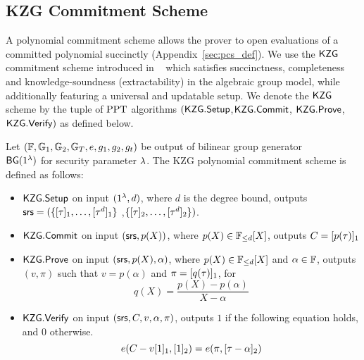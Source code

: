 \subsection{KZG Commitment Scheme}
\label{sec:KZG}
A polynomial commitment scheme allows the prover to open evaluations of a committed polynomial succinctly (Appendix~\ref{sec:pcs_def}).
We use the $\mathsf{KZG}$ commitment scheme introduced in ~\cite{AC:KatZavGol10} which satisfies succinctness, completeness and knowledge-soundness (extractability)
in the algebraic group model, while additionally featuring a universal and updatable setup. We denote the $\mathsf{KZG}$ scheme by the tuple of $\mathrm{PPT}$ algorithms $(\mathsf{KZG.Setup}$,$\mathsf{KZG.Commit}$, $\mathsf{KZG.Prove}$, $\mathsf{KZG.Verify})$ as defined below.
\begin{definition}
	Let $(\mathbb{F},\mathbb{G}_1,\mathbb{G}_2,\mathbb{G}_T, e, g_1, g_2, g_t)$ be output of bilinear group generator \\
	$\mathsf{BG}(1^{\lambda})$ for security parameter $\lambda$.
	The KZG polynomial commitment scheme is defined as follows:
	\begin{itemize}[leftmargin=1em]
		\item $\mathsf{KZG.Setup}$ on input $(1^{\lambda},d)$, where $d$ is the degree bound, outputs
		$\mathsf{srs} = (\{[\tau]_1,\ldots,[\tau^d]_1\}$ ,$\{[\tau]_2,\ldots,[\tau^d]_2\})$.
		\item $\mathsf{KZG.Commit}$ on input $(\mathsf{srs},p(X))$, where $p(X) \in \mathbb{F}_{\leq d}[X]$, outputs $C=[p(\tau)]_1$
		\item $\mathsf{KZG.Prove}$ on input $(\mathsf{srs},p(X),\alpha)$, where $p(X) \in \mathbb{F}_{\leq d}[X]$ and $\alpha\in \mathbb{F}$, outputs $(v, \pi)$ such that $v=p(\alpha)$ and $\pi=[q(\tau)]_1$, for
		\[ q(X)=\frac{p(X)-p(\alpha)}{X-\alpha} \]
		\item $\mathsf{KZG.Verify}$ on input $(\mathsf{srs},C,v, \alpha,\pi)$, outputs $1$ if the following equation holds, and $0$ otherwise.
		\[ e(C-v[1]_1, [1]_2) = e(\pi, [\tau-\alpha]_2) \]
	\end{itemize}
\end{definition}

